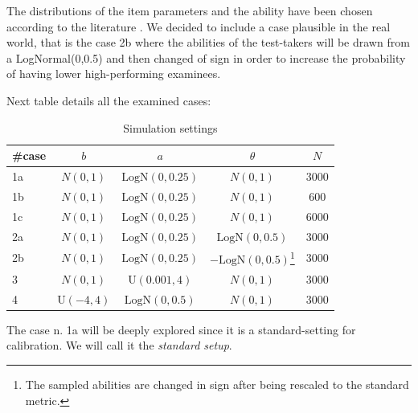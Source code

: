 The distributions of the item parameters and the ability have been chosen according to the literature \parencite[see for example]{glas2005modeling, glas2005testing, ban2002data}.
We decided to include a case plausible in the real world, that is the case 2b where the abilities of the test-takers will be drawn from a LogNormal(0,0.5) and then changed of sign in order to increase the probability of having lower high-performing examinees. 

	\renewcommand{\arraystretch}{1.3}%
Next table details all the examined cases:
\begin{table}[htpb]
\centering
\caption{Simulation settings \label{tab:casesJulia}}

	\begin{tabular}{ l c c c c  }
		\toprule
		\#case     & $b$ & $a$ & $\theta$ & $N$ \\%
		\midrule
		1a    & $N(0,1)$ & $\text{LogN}(0,0.25)$& $N(0,1)$ & $3000$ \\%
		1b   & $N(0,1)$ & $\text{LogN}(0,0.25)$ & $N(0,1)$  & $600$ \\%
		1c    & $N(0,1)$ & $\text{LogN}(0,0.25)$ & $N(0,1)$ &  $6000$ \\%
		2a    & $N(0,1)$ & $\text{LogN}(0,0.25)$ & $\text{LogN}(0,0.5)$& $3000$\\%
		2b    & $N(0,1)$ & $\text{LogN}(0,0.25)$ & $-\text{LogN}(0,0.5)$\footnote{The sampled abilities are changed in sign after being rescaled to the standard metric.}& $3000$\\%
		3    & $N(0,1)$ & $\text{U}(0.001,4)$ & $N(0,1)$  & $3000$\\%
		4    & $\text{U}(-4,4)$ &  $\text{LogN}(0,0.5)$& $N(0,1)$  & $3000$\\%
		\bottomrule    
		
	\end{tabular}
	
\end{table}

The case n. 1a will be deeply explored since it is a standard-setting for calibration. We will call it the \emph{standard setup}.

